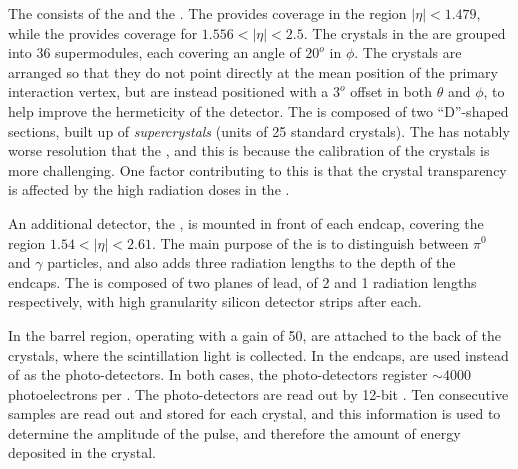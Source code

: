 The \ECAL consists of the \EB and the \EE. The \EB provides coverage in the region $|\eta| < 1.479$, while the \EE provides coverage for $1.556 < |\eta| < 2.5$. The crystals in the \EB are grouped into 36 supermodules, each covering an angle of $20^o$ in $\phi$. The crystals are arranged so that they do not point directly at the mean position of the primary interaction vertex, but are instead positioned with a $3^o$ offset in both $\theta$ and $\phi$, to help improve the hermeticity of the detector. The \EE is composed of two ``D''-shaped sections, built up of \emph{supercrystals} (units of 25 standard crystals). The \EE has notably worse resolution that the \EB, and this is because the calibration of the crystals is more challenging. One factor contributing to this is that the crystal transparency is affected by the high radiation doses in the \EE. %

An additional detector, the \ES, is mounted in front of each endcap, covering the region $1.54 <|\eta| < 2.61$. The main purpose of the \ES is to distinguish between $\pi^0$ and $\gamma$ particles, and also adds three radiation lengths to the depth of the \ECAL endcaps. The \ES is composed of two planes of lead, of 2 and 1 radiation lengths respectively, with high granularity silicon detector strips after each. %

In the barrel region, \APDs operating with a gain of 50, are attached to the back of the crystals, where the scintillation light is collected. In the endcaps, \VPTs are used instead of \APDs as the photo-detectors. In both cases, the photo-detectors register $\sim 4000 $ photoelectrons per \GeV. The photo-detectors are read out by 12-bit \ADC. Ten consecutive samples are read out and stored for each crystal, and this information is used to determine the amplitude of the pulse, and therefore the amount of energy deposited in the crystal.

